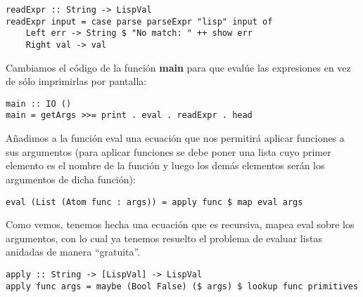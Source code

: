 \begin{minipage}{\linewidth}
\begin{footnotesize}
\begin{lstlisting}[frame=single]
readExpr :: String -> LispVal
readExpr input = case parse parseExpr "lisp" input of
    Left err -> String $ "No match: " ++ show err
    Right val -> val
\end{lstlisting}
\end{footnotesize}
\end{minipage}

Cambiamos el c\'odigo de la funci\'on \textbf{main} para que eval\'ue las expresiones en vez de s\'olo imprimirlas por pantalla:\\

\begin{minipage}{\linewidth}
\begin{footnotesize}
\begin{lstlisting}[frame=single]
main :: IO ()
main = getArgs >>= print . eval . readExpr . head
\end{lstlisting}
\end{footnotesize}
\end{minipage}

A\~nadimos a la funci\'on eval una ecuaci\'on que nos permitir\'a aplicar funciones a sus argumentos (para aplicar funciones se debe poner una lista cuyo primer elemento es el nombre de la funci\'on y luego los dem\'as elementos ser\'an los argumentos de dicha funci\'on):\\

\begin{minipage}{\linewidth}
\begin{footnotesize}
\begin{lstlisting}[frame=single]
eval (List (Atom func : args)) = apply func $ map eval args
\end{lstlisting}
\end{footnotesize}
\end{minipage}

Como vemos, tenemos hecha una ecuaci\'on que es recursiva, mapea eval sobre los argumentos, con lo cual ya tenemos resuelto el problema de evaluar listas anidadas de manera ``gratuita''.\\

\begin{minipage}{\linewidth}
\begin{footnotesize}
\begin{lstlisting}[frame=single]
apply :: String -> [LispVal] -> LispVal
apply func args = maybe (Bool False) ($ args) $ lookup func primitives
\end{lstlisting}
\end{footnotesize}
\end{minipage}

